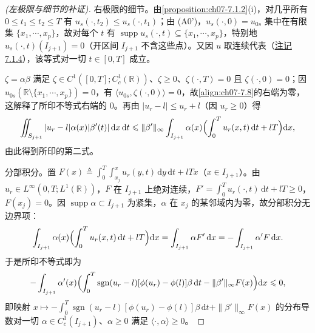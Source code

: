 \documentclass[../../main.tex]{subfiles}%
\begin{document}
\begin{proof}[(左极限与细节的补证)]
右极限的细节。由\cref{proposition:ch07-7.1.2}(i)，对几乎所有 $0\leqslant t_1\leqslant t_2\leqslant T$ 有 $u_s(\cdot,t_2)\leqslant u_s(\cdot,t_1)$；由 (A0')，$u_s(\cdot,0)=u_{0s}$ 集中在有限集 $\{x_1,\cdots,x_p\}$，故对每个 $t$ 有 $\operatorname{supp}u_s(\cdot,t)\subseteq\{x_1,\cdots,x_p\}$，特别地 $u_s(\cdot,t)(I_{j+1})=0$（开区间 $I_{j+1}$ 不含这些点）。又因 $u$ 取连续代表（\hyperref[remark:ch07-7.1.4]{注记 7.1.4}），该等式对一切 $t\in[0,T]$ 成立。

$\zeta=\alpha\beta$ 满足 $\zeta\in C^1([0,T];C^1_c(\mathbb{R}))$、$\zeta\geqslant0$、$\zeta(\cdot,T)=0$ 且 $\zeta(\cdot,0)=0$；因 $u_{0s}(\mathbb{R}\setminus\{x_1,\cdots,x_p\})=0$，有 $\langle u_{0s},\zeta(\cdot,0)\rangle=0$，故\eqref{align:ch07-7.8}的右端为零，这解释了所印不等式右端的 $0$。再由 $|u_r-l|\leqslant u_r+l$（因 $u_r\geqslant0$）得
\begin{align*}
\iint_{S_{j+1}}|u_r-l|\alpha(x)|\beta'(t)|\,\mathrm{d}x\,\mathrm{d}t
\leqslant\|\beta'\|_\infty\int_{I_{j+1}}\alpha(x)\Bigl(\int_0^Tu_r(x,t)\,\mathrm{d}t+lT\Bigr)\mathrm{d}x,
\end{align*}
由此得到所印的第二式。

分部积分。置 $F(x)\triangleq\int_0^T\int_{x_j}^xu_r(y,t)\,\mathrm{d}y\,\mathrm{d}t+lTx$（$x\in I_{j+1}$）。由 $u_r\in L^\infty(0,T;L^1(\mathbb{R}))$，$F$ 在 $I_{j+1}$ 上绝对连续，$F'=\int_0^Tu_r(\cdot,t)\,\mathrm{d}t+lT\geqslant0$，$F(x_j)=0$。因 $\operatorname{supp}\alpha\subset I_{j+1}$ 为紧集，$\alpha$ 在 $x_j$ 的某邻域内为零，故分部积分无边界项：
\begin{align*}
\int_{I_{j+1}}\alpha(x)\Bigl(\int_0^Tu_r(x,t)\,\mathrm{d}t+lT\Bigr)\mathrm{d}x
=\int_{I_{j+1}}\alpha F'\,\mathrm{d}x=-\int_{I_{j+1}}\alpha'F\,\mathrm{d}x.
\end{align*}
于是所印不等式即为
\begin{align*}
-\int_{I_{j+1}}\alpha'(x)\Bigl(\int_0^T\operatorname{sgn}(u_r-l)[\phi(u_r)-\phi(l)]\beta\,\mathrm{d}t-\|\beta'\|_\infty F(x)\Bigr)\mathrm{d}x\leqslant0,
\end{align*}
即映射 $x\mapsto-\int_0^T\operatorname{sgn}(u_r-l)[\phi(u_r)-\phi(l)]\beta\,\mathrm{d}t+\|\beta'\|_\infty F(x)$ 的分布导数对一切 $\alpha\in C^1_c(I_{j+1})$、$\alpha\geqslant0$ 满足 $\langle\cdot,\alpha\rangle\geqslant0$。


\end{proof}
\end{document}
